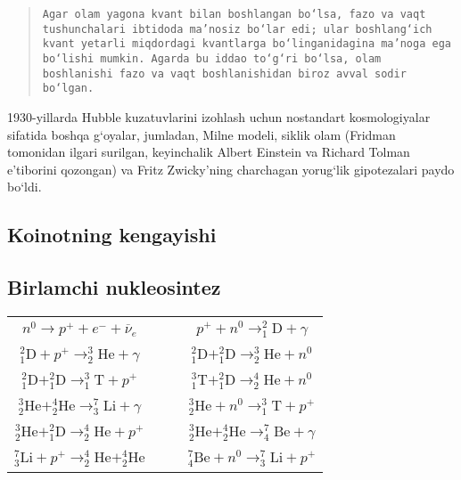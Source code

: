 \documentclass[14pt]{scrartcl}
\begin{document}
\begin{quote}\texttt{Agar olam yagona kvant bilan boshlangan bo`lsa, fazo va vaqt tushunchalari ibtidoda ma'nosiz bo`lar edi; ular boshlang`ich kvant yetarli miqdordagi kvantlarga bo`linganidagina ma'noga ega bo`lishi mumkin. Agarda bu iddao to`g`ri bo`lsa, olam boshlanishi fazo va vaqt boshlanishidan biroz avval sodir bo`lgan.} 
\end{quote}
1930-yillarda Hubble kuzatuvlarini izohlash uchun nostandart kosmologiyalar sifatida boshqa g`oyalar, jumladan, Milne modeli, siklik olam (Fridman tomonidan ilgari surilgan, keyinchalik Albert Einstein va Richard Tolman e'tiborini qozongan) va Fritz Zwicky'ning charchagan yorug`lik gipotezalari paydo bo`ldi.

\subsection{Koinotning kengayishi}
\hspace{0.6cm}
\subsection{Birlamchi nukleosintez}
\hspace{0.6cm}
	\renewcommand{\arraystretch}{1.8}
\begin{center}
	\begin{tabular}{c c c}
		$n^{0}\rightarrow p^{+} + e^{-} + \overline{\nu}_{e}$&\ \ &$p^{+}+n^{0}\rightarrow^{2}_{1}\textrm{D} +\gamma$\\
		$^{2}_{1}\textrm{D}+p^{+}\rightarrow ^{3}_{2}\textrm{He}+\gamma$&\ \ &$^{2}_{1}\textrm{D}+^{2}_{1}\textrm{D}\rightarrow ^{3}_{2}\textrm{He}+n^{0}$\\
		$^{2}_{1}\textrm{D}+^{2}_{1}\textrm{D}\rightarrow ^{3}_{1}\textrm{T}+p^{+}$&\ \ &$^{3}_{1}\textrm{T}+^{2}_{1}\textrm{D}\rightarrow ^{4}_{2}\textrm{He}+n^{0}$\\
		$^{3}_{2}\textrm{He}+^{4}_{2}\textrm{He}\rightarrow ^{7}_{3}\textrm{Li}+\gamma$&\ \ &$^{3}_{2}\textrm{He}+n^{0}\rightarrow ^{3}_{1}\textrm{T}+p^{+}$\\
		$^{3}_{2}\textrm{He}+^{2}_{1}\textrm{D}\rightarrow ^{4}_{2}\textrm{He}+p^{+}$&\ \ &$^{3}_{2}\textrm{He}+^{4}_{2}\textrm{He}\rightarrow ^{7}_{4}\textrm{Be}+\gamma$\\
		$^{7}_{3}\textrm{Li}+p^{+}\rightarrow ^{4}_{2}\textrm{He}+^{4}_{2}\textrm{He}$&\ \ &$^{7}_{4}\textrm{Be}+n^{0}\rightarrow ^{7}_{3}\textrm{Li}+p^{+}$\\
	\end{tabular}
\end{center}
\end{document}

